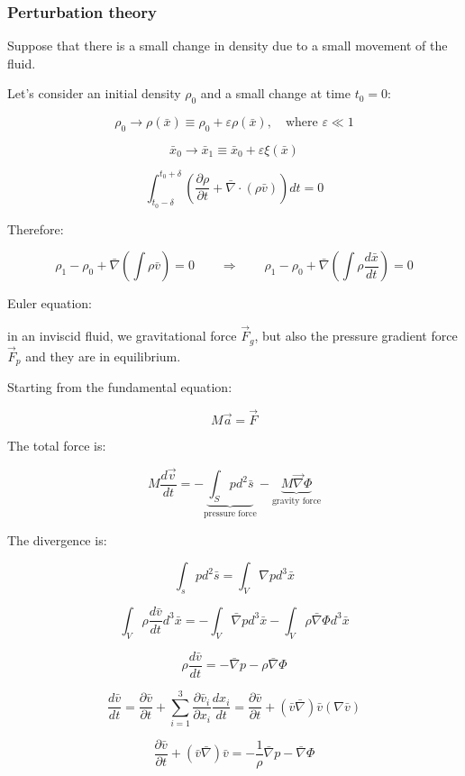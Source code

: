 
\subsubsection{Perturbation theory}

Suppose that there is a small change in density due to a small movement of the fluid.

Let's consider an initial density $\rho_0$ and a small change at time $t_0 = 0$:

$$
\rho_0 \to \rho(\bar x) \equiv \rho_0 + \varepsilon \rho(\bar x), \quad \text{where } \varepsilon \ll 1
$$

$$
\bar x_0 \to \bar x_1 \equiv \bar x_0 + \varepsilon \xi (\bar x)
$$

$$
\int_{t_0 - \delta}^{t_0 + \delta} \left( \dfrac{\partial \rho}{\partial t} + \bar \nabla \cdot (\rho \bar v) \right) dt = 0
$$

Therefore:

$$
\rho_1 - \rho_0 + \bar \nabla \left( \int \rho \bar v \right) = 0
\qquad \Rightarrow \qquad
\rho_1 - \rho_0 + \bar \nabla \left( \int \rho \dfrac{d\bar x}{dt} \right) = 0
$$

Euler equation:

in an inviscid fluid, we gravitational force $\vec F_g$, but also the pressure gradient force $\vec F_p$ and they are in equilibrium.

Starting from the fundamental equation:

$$
M \vec a = \vec F
$$

The total force is:

$$
M \dfrac{d\vec v}{dt} = - \underbrace{\int_S p d^2 \bar s}_{\text{pressure force}} - \underbrace{M \vec \nabla \Phi}_{\text{gravity force}}
$$

The divergence is:

$$
\int_s p d^2 \bar s = \int_V \nabla p d^3 \bar x
$$

$$
\int_V \rho \dfrac{d \bar v}{dt} d^3 \bar x = - \int_V \bar \nabla p d^3 \bar x - \int_V \rho \bar \nabla \Phi d^3 \bar x
$$

$$
\rho \dfrac{d \bar v}{dt} = - \bar \nabla p - \rho \bar \nabla \Phi
$$

$$
\dfrac{d \bar v}{dt} = \dfrac{\partial \bar v}{\partial t} + \sum_{i = 1}^3 \dfrac {\partial \bar v_i}{\partial x_i} \dfrac{d x_i}{dt} = \dfrac {\partial \bar v}{\partial t} + (\bar v \bar \nabla) \bar v (\nabla \bar v)
$$

$$
\dfrac{\partial \bar v}{\partial t} + (\bar v \bar \nabla) \bar v = - \dfrac 1\rho \bar \nabla p - \bar \nabla \Phi
$$


